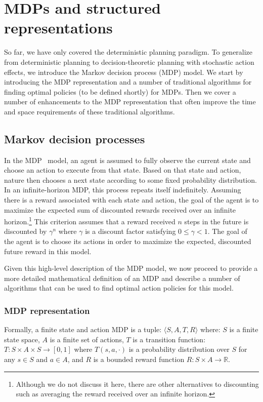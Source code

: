 \section{MDPs and structured representations}

So far, we have only covered the deterministic planning paradigm.  To
generalize from deterministic planning to decision-theoretic planning
with stochastic action effects, we introduce the Markov decision
process (MDP) model.  We start by introducing the MDP representation
and a number of traditional algorithms for finding optimal policies
(to be defined shortly) for MDPs.  Then we cover a number of
enhancements to the MDP representation that often improve the time and
space requirements of these traditional algorithms.

\subsection{Markov decision processes}

In the MDP~\cite{Puterman} model, an agent is assumed to fully observe
the current state and choose an action to execute from that state.
Based on that state and action, nature then chooses a 
next state  
according to some fixed probability distribution.  In an
infinite-horizon MDP, this process repeats itself indefinitely.
Assuming there is a reward associated with each state and
action, the goal of the agent is to maximize the expected sum of
discounted rewards received over an infinite 
horizon.\footnote{Although we
do not discuss it here, there are other alternatives to discounting
such as averaging the reward received over an
infinite horizon.}  This criterion assumes that a reward received
$n$ steps in the future is discounted by $\gamma^n$ where $\gamma$ is
a discount factor satisfying $0 \leq \gamma < 1$.  The goal of the
agent is to choose its actions in order to maximize
the expected, discounted future reward in this model.

Given this high-level description of the MDP model, we now proceed to
provide a more detailed mathematical definition of an MDP
and describe a number of algorithms
that can be used to find optimal action policies for this model.

\subsubsection{MDP representation}

Formally, a finite state and action MDP is
a tuple: $\langle S, A, T, R \rangle$
where: $S$ is a finite state space, $A$ is a finite set of actions,
$T$ is a transition function: $T: S \times A \times S \rightarrow [0,1]$
where $T(s,a,\cdot)$ is a probability distribution over $S$ for any
$s \in S$ and $a \in A$, and $R$ is a bounded 
reward function $R: S \times A \rightarrow \mathbb{R}$.

